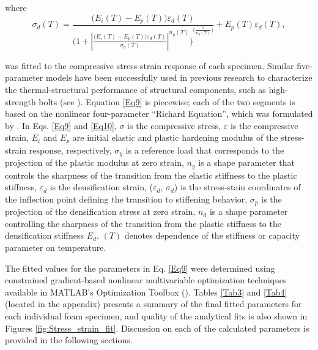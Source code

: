 \documentclass[review]{elsarticle}
\begin{document}
where
\begin{equation}\label{Eq10}
\sigma_d(T)= \frac{\big(E_i(T)-E_p(T)\big)\varepsilon_d(T)}{{\Bigg(1+\left | \frac{\big(E_i(T)-E_p(T)\big)\varepsilon_d(T)}{\sigma_p(T)} \right |^{n_y(T)}\Bigg)}^{\Big(\frac{1}{n_y(T)}\Big)}} + E_p(T)\varepsilon_d(T), 
\end{equation}

was fitted to the compressive stress-strain response of each specimen. Similar five-parameter models have been successfully used in previous research to characterize the thermal-structural performance of structural components, such as high-strength bolts (see \cite{Wei2018}). Equation \ref{Eq9} is piecewise; each of the two segments is based on the nonlinear four-parameter “Richard Equation”, which was formulated by \cite{Ric1975}. In Eqs. \ref{Eq9} and \ref{Eq10}, $\sigma$ is the compressive stress, $\varepsilon$ is the compressive strain, $E_i$ and $E_p$ are initial elastic and plastic hardening modulus of the stress-strain response, respectively, $\sigma_y$ is a reference load that corresponds to the projection of the plastic modulus at zero strain, $n_y$ is a shape parameter that controls the sharpness of the transition from the elastic stiffness to the plastic stiffness, $\varepsilon_d$ is the densification strain, ($\varepsilon_d$, $\sigma_d$) is the stress-stain coordinates of the inflection point defining the transition to stiffening behavior, $\sigma_p$ is the projection of the densification stress at zero strain, $n_d$ is a shape parameter controlling the sharpness of the transition from the plastic stiffness to the densification stiffness $E_d$. $(T)$ denotes dependence of the stiffness or capacity parameter on temperature.

The fitted values for the parameters in Eq. \ref{Eq9} were determined using constrained gradient-based nonlinear multivariable optimization techniques available in MATLAB’s Optimization Toolbox (\cite{Mat}). Tables \ref{Tab3} and \ref{Tab4} (located in the appendix) presents a summary of the final fitted parameters for each individual foam specimen, and quality of the analytical fits is also shown in Figures \ref{fig:Stress_strain_fit}. Discussion on each of the calculated parameters is provided in the following sections.
\end{document}
